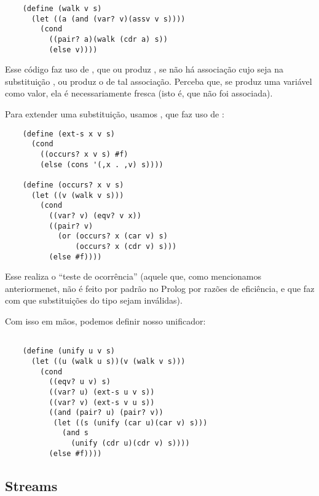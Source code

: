 \documentclass{article}
\begin{document}
  \begin{lstlisting}
    (define (walk v s)
      (let ((a (and (var? v)(assv v s))))
        (cond
          ((pair? a)(walk (cdr a) s))
          (else v))))
  \end{lstlisting}

  \noindent Esse código faz uso de , que ou produz
  , se não há associação cujo  seja
   na substituição , ou produz o
   de tal associação. Perceba que, se 
  produz uma variável como valor, ela é necessariamente fresca (isto
  é, que não foi associada).

  Para extender uma substituição, usamos , que faz
  uso de :

  \begin{lstlisting}
    (define (ext-s x v s)
      (cond
        ((occurs? x v s) #f)
        (else (cons '(,x . ,v) s))))

    (define (occurs? x v s)
      (let ((v (walk v s)))
        (cond
          ((var? v) (eqv? v x))
          ((pair? v)
            (or (occurs? x (car v) s)
                (occurs? x (cdr v) s)))
          (else #f))))
  \end{lstlisting}

  Esse  realiza o ``teste de ocorrência'' (aquele
  que, como mencionamos anteriormenet, não é feito por padrão no
  Prolog por razões de eficiência, e que faz com que substituições do
  tipo  sejam inválidas).

  Com isso em mãos, podemos definir nosso unificador:

  \begin{lstlisting}

    (define (unify u v s)
      (let ((u (walk u s))(v (walk v s)))
        (cond
          ((eqv? u v) s)
          ((var? u) (ext-s u v s))
          ((var? v) (ext-s v u s))
          ((and (pair? u) (pair? v))
           (let ((s (unify (car u)(car v) s)))
             (and s
               (unify (cdr u)(cdr v) s))))
          (else #f))))

  \end{lstlisting}

  \subsection{Streams}
\end{document}
